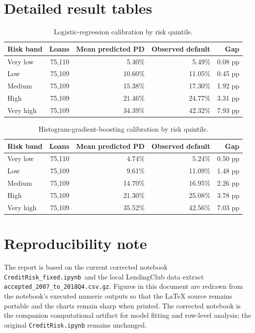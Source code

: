 \documentclass[11pt]{article}
\newcommand{\sourcefile}{\texttt{accepted\_2007\_to\_2018Q4.csv.gz}}
\newcommand{\notebook}{\texttt{CreditRisk\_fixed.ipynb}}
\begin{document}
\appendix
\section{Detailed result tables}

\begin{table}[H]
\centering
\caption{Logistic-regression calibration by risk quintile.}
\label{tab:lr-calibration}
\begin{tabular}{lrrrr}
\toprule
Risk band & Loans & Mean predicted PD & Observed default & Gap \\
\midrule
Very low & 75,110 & 5.40\% & 5.49\% & 0.08 pp \\
Low & 75,109 & 10.60\% & 11.05\% & 0.45 pp \\
Medium & 75,109 & 15.38\% & 17.30\% & 1.92 pp \\
High & 75,109 & 21.46\% & 24.77\% & 3.31 pp \\
Very high & 75,109 & 34.39\% & 42.32\% & 7.93 pp \\
\bottomrule
\end{tabular}
\end{table}

\begin{table}[H]
\centering
\caption{Histogram-gradient-boosting calibration by risk quintile.}
\label{tab:gb-calibration}
\begin{tabular}{lrrrr}
\toprule
Risk band & Loans & Mean predicted PD & Observed default & Gap \\
\midrule
Very low & 75,110 & 4.74\% & 5.24\% & 0.50 pp \\
Low & 75,109 & 9.61\% & 11.09\% & 1.48 pp \\
Medium & 75,109 & 14.70\% & 16.95\% & 2.26 pp \\
High & 75,109 & 21.30\% & 25.08\% & 3.78 pp \\
Very high & 75,109 & 35.52\% & 42.56\% & 7.03 pp \\
\bottomrule
\end{tabular}
\end{table}

\section{Reproducibility note}

The report is based on the current corrected notebook \notebook\ and the local
LendingClub data extract \sourcefile. Figures in this document are redrawn from
the notebook's executed numeric outputs so that the LaTeX source remains portable
and the charts remain sharp when printed. The corrected notebook is the companion
computational artifact for model fitting and row-level analysis; the original
\texttt{CreditRisk.ipynb} remains unchanged.
\end{document}
